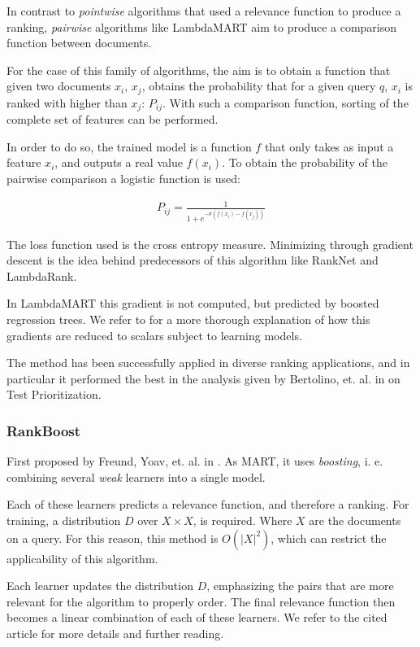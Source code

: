 In contrast to \emph{pointwise} algorithms that used a relevance function to produce a ranking, 
\emph{pairwise} algorithms like LambdaMART aim to produce a comparison function between documents.

For the case of this family of algorithms, the aim is to obtain a function that given two documents $x_i$, $x_j$, 
obtains the probability that for a given query $q$, $x_i$ is ranked with higher than $x_j$: $P_{ij}$. With 
such a comparison function, sorting of the complete set of features can be performed.

In order to do so, the trained model is a function $f$ that only takes as input a feature $x_i$, 
and outputs a real value $f(x_i)$. To obtain the probability of the pairwise comparison a logistic function is used:

\begin{align*}
P_{ij} = \frac{1}{1+e^{-\sigma(f(x_i)-f(x_j))}}
\end{align*}

The loss function used is the cross entropy measure. Minimizing through gradient descent is the idea behind predecessors
of this algorithm like RankNet and LambdaRank.

In LambdaMART this gradient is not computed, but predicted by boosted regression trees. We refer
to \cite{lambdamart} for a more thorough explanation of how this gradients are reduced to scalars
subject to learning models.

The method has been successfully applied in diverse ranking applications, and in particular it performed
the best in the analysis given by Bertolino, et. al. in \cite{Bertolino2020LearningtoRankVR} on Test Prioritization.

\subsubsection{RankBoost}\label{s:bg-tsp-rankboost}

First proposed by Freund, Yoav, et. al. in \cite{10.5555/945365.964285}. As MART, it uses \emph{boosting}, i. e. combining
several \emph{weak} learners into a single model.

Each of these learners predicts a relevance function, and therefore a ranking. For training, a distribution $D$ over
$X\times X$, is required. Where $X$ are the documents on a query. For this reason, this method is $O(|X|^2)$, which
can restrict the applicability of this algorithm. 

Each learner updates the distribution $D$, emphasizing the pairs that are more relevant for the algorithm
to properly order. The final relevance function then becomes a linear combination of each of these learners.
We refer to the cited article for more details and further reading.

